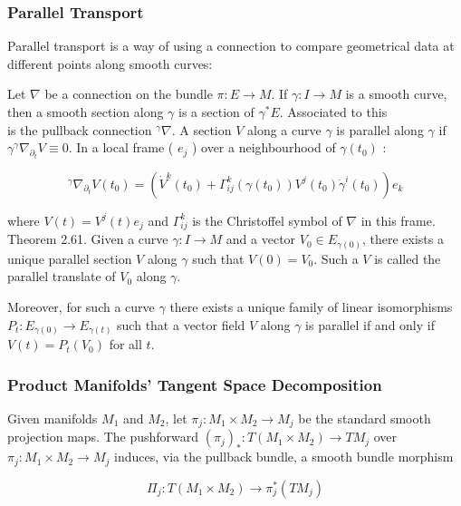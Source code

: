 \documentclass[10pt, letterpaper]{article}
\begin{document}
\subsubsection*{Parallel Transport}
Parallel transport is a way of using a connection to compare geometrical data at different points along smooth curves:

Let $\nabla$ be a connection on the bundle $\pi: E \rightarrow M$. If $\gamma: I \rightarrow M$ is a smooth curve, then a smooth section along $\gamma$ is a section of $\gamma^{*} E$. Associated to this\\
is the pullback connection ${ }^{\gamma} \nabla$. A section $V$ along a curve $\gamma$ is parallel along $\gamma$ if $\gamma^{\gamma} \nabla_{\partial_{t}} V \equiv 0$. In a local frame ( $e_{j}$ ) over a neighbourhood of $\gamma\left(t_{0}\right)$ :

$$
{ }^{\gamma} \nabla_{\partial_{t}} V\left(t_{0}\right)=\left(\dot{V}^{k}\left(t_{0}\right)+\Gamma_{i j}^{k}\left(\gamma\left(t_{0}\right)\right) V^{j}\left(t_{0}\right) \dot{\gamma}^{i}\left(t_{0}\right)\right) e_{k}
$$

where $V(t)=V^{j}(t) e_{j}$ and $\Gamma_{i j}^{k}$ is the Christoffel symbol of $\nabla$ in this frame.\\
Theorem 2.61. Given a curve $\gamma: I \rightarrow M$ and a vector $V_{0} \in E_{\gamma(0)}$, there exists a unique parallel section $V$ along $\gamma$ such that $V(0)=V_{0}$. Such a $V$ is called the parallel translate of $V_{0}$ along $\gamma$.

Moreover, for such a curve $\gamma$ there exists a unique family of linear isomorphisms $P_{t}: E_{\gamma(0)} \rightarrow E_{\gamma(t)}$ such that a vector field $V$ along $\gamma$ is parallel if and only if $V(t)=P_{t}\left(V_{0}\right)$ for all $t$.

\subsubsection*{Product Manifolds' Tangent Space Decomposition}
Given manifolds $M_{1}$ and $M_{2}$, let $\pi_{j}: M_{1} \times M_{2} \rightarrow M_{j}$ be the standard smooth projection maps. The pushforward $\left(\pi_{j}\right)_{*}: T\left(M_{1} \times M_{2}\right) \rightarrow T M_{j}$ over $\pi_{j}: M_{1} \times M_{2} \rightarrow M_{j}$ induces, via the pullback bundle, a smooth bundle morphism

$$
\Pi_{j}: T\left(M_{1} \times M_{2}\right) \rightarrow \pi_{j}^{*}\left(T M_{j}\right)
$$
\end{document}
